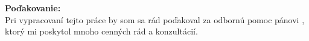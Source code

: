\begin{flushleft}
    \textbf{Poďakovanie:}\\
    \vspace{1em}
Pri vypracovaní tejto práce by som sa rád poďakoval za odbornú pomoc pánovi \professor, ktorý mi poskytol mnoho cenných rád a konzultácií. 
\end{flushleft}

